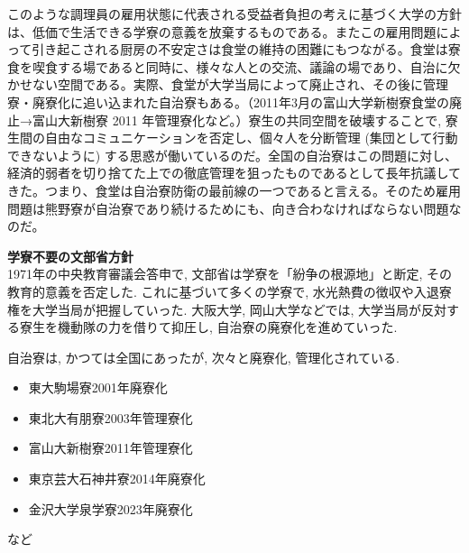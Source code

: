 		
		このような調理員の雇用状態に代表される受益者負担の考えに基づく大学の方針は、低価で生活できる学寮の意義を放棄するものである。またこの雇用問題によって引き起こされる厨房の不安定さは食堂の維持の困難にもつながる。食堂は寮食を喫食する場であると同時に、様々な人との交流、議論の場であり、自治に欠かせない空間である。実際、食堂が大学当局によって廃止され、その後に管理寮・廃寮化に追い込まれた自治寮もある。（2011年3月の富山大学新樹寮食堂の廃止→富山大新樹寮 2011 年管理寮化など。）寮生の共同空間を破壊することで, 寮生間の自由なコミュニケーションを否定し、個々人を分断管理 (集団として行動できないように) する思惑が働いているのだ。全国の自治寮はこの問題に対し、経済的弱者を切り捨てた上での徹底管理を狙ったものであるとして長年抗議してきた。つまり、食堂は自治寮防衛の最前線の一つであると言える。そのため雇用問題は熊野寮が自治寮であり続けるためにも、向き合わなければならない問題なのだ。

		\begin{shadebox}
      \textbf{学寮不要の文部省方針} \\
      1971年の中央教育審議会答申で, 文部省は学寮を「紛争の根源地」と断定, その教育的意義を否定した. これに基づいて多くの学寮で, 水光熱費の徴収や入退寮権を大学当局が把握していった. 大阪大学, 岡山大学などでは, 大学当局が反対する寮生を機動隊の力を借りて抑圧し, 自治寮の廃寮化を進めていった.
      
      \tatespace
      自治寮は, かつては全国にあったが, 次々と廃寮化, 管理化されている.
      \begin{itemize}
        \item 東大駒場寮2001年廃寮化
        \item 東北大有朋寮2003年管理寮化
        \item 富山大新樹寮2011年管理寮化
        \item 東京芸大石神井寮2014年廃寮化
　　　 \item 金沢大学泉学寮2023年廃寮化
      \end{itemize}
      など
  \end{shadebox}

